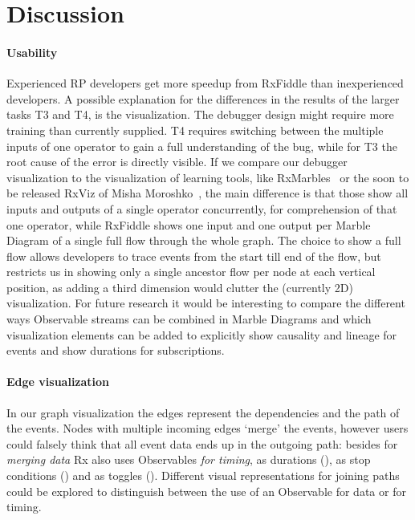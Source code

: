 \section{Discussion}
\paragraph{Usability}
Experienced RP developers get more speedup from RxFiddle than inexperienced developers. A possible explanation for the differences in the results of the larger tasks T3 and T4, is the visualization. The debugger design might require more training than currently supplied. T4 requires switching between the multiple inputs of one operator to gain a full understanding of the bug, while for T3 the root cause of the error is directly visible. If we compare our debugger visualization to the visualization of learning tools, like RxMarbles~\cite{rxmarbles} or the soon to be released RxViz of Misha Moroshko~\cite{rxviz}, the main difference is that those show all inputs and outputs of a single operator concurrently, for comprehension of that one operator, while RxFiddle shows one input and one output per Marble Diagram of a single full flow through the whole graph. The choice to show a full flow allows developers to trace events from the start till end of the flow, but restricts us in showing only a single ancestor flow per node at each vertical position, as adding a third dimension would clutter the (currently 2D) visualization. For future research it would be interesting to compare the different ways Observable streams can be combined in Marble Diagrams and which visualization elements can be added to explicitly show causality and lineage for events and show durations for subscriptions.

\paragraph{Edge visualization}
In our graph visualization the edges represent the dependencies and the path of the events. Nodes with multiple incoming edges `merge' the events, however users could falsely think that all event data ends up in the outgoing path: besides for \textit{merging data} Rx also uses Observables \textit{for timing}, as durations (), as stop conditions () and as toggles (). Different visual representations for joining paths could be explored to distinguish between the use of an Observable for data or for timing.
